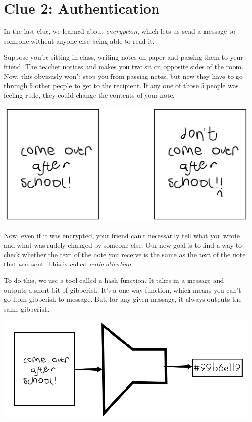 \documentclass{article}
\begin{document}
\newpage

\section*{Clue 2: Authentication}

In the last clue, we learned about \textit{encryption}, which lets us send a message to someone without anyone else being able to read it. 

Suppose you're sitting in class, writing notes on paper and passing them to your friend. The teacher notices and makes you two sit on opposite sides of the room. Now, this obviously won't stop you from passing notes, but now they have to go through 5 other people to get to the recipient. If any one of those 5 people was feeling rude, they could change the contents of your note.

\begin{minipage}{\textwidth}
\centering
\includegraphics[width=.6\textwidth]{tampered}
\end{minipage}

Now, even if it was encrypted, your friend can't necessarily tell what you wrote and what was rudely changed by someone else. Our new goal is to find a way to check whether the text of the note you receive is the same as the text of the note that was sent. This is called \textit{authentication}.

To do this, we use a tool called a hash function. It takes in a message and outputs a short bit of gibberish. It's a one-way function, which means you can't go from gibberish to message. But, for any given message, it always outputs the same gibberish. 

\begin{minipage}{\textwidth}
\centering
\includegraphics[width=.7\textwidth]{hash}
\end{minipage}
\end{document}
